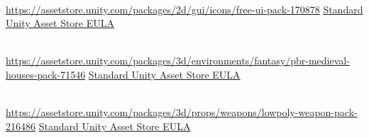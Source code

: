 \begin{description}[]
\item[Free Ui Pack] \hfill \\ \url{https://assetstore.unity.com/packages/2d/gui/icons/free-ui-pack-170878}
  \href{https://unity.com/legal/as-terms}{Standard Unity Asset Store EULA}

\item[PBR medieval houses pack] \hfill \\ \url{https://assetstore.unity.com/packages/3d/environments/fantasy/pbr-medieval-houses-pack-71546}
  \href{https://unity.com/legal/as-terms}{Standard Unity Asset Store EULA}

\item[LOWPOLY - Weapon Pack] \hfill \\ \url{https://assetstore.unity.com/packages/3d/props/weapons/lowpoly-weapon-pack-216486}
  \href{https://unity.com/legal/as-terms}{Standard Unity Asset Store EULA}
\end{description}
